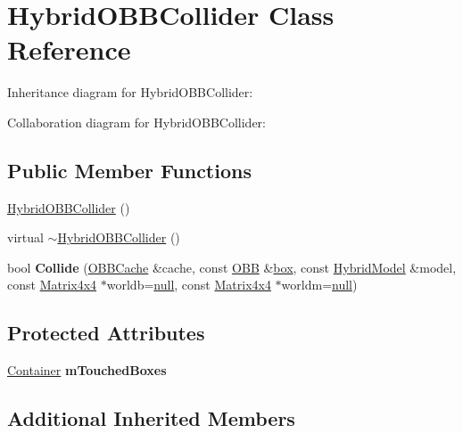 \hypertarget{class_hybrid_o_b_b_collider}{\section{Hybrid\+O\+B\+B\+Collider Class Reference}
\label{class_hybrid_o_b_b_collider}
}


Inheritance diagram for Hybrid\+O\+B\+B\+Collider\+:


Collaboration diagram for Hybrid\+O\+B\+B\+Collider\+:
\subsection*{Public Member Functions}
\begin{DoxyCompactItemize}
\item 
\hyperlink{class_hybrid_o_b_b_collider_a2b99e0c6c8d022f3b6479455c8856976}{Hybrid\+O\+B\+B\+Collider} ()
\item 
virtual \hyperlink{class_hybrid_o_b_b_collider_a5e586273fcac97be30a049b45b584b53}{$\sim$\+Hybrid\+O\+B\+B\+Collider} ()
\item 
\hypertarget{class_hybrid_o_b_b_collider_a4f5c790cc308ace8db5c8d27f5c5805a}{bool {\bfseries Collide} (\hyperlink{struct_o_b_b_cache}{O\+B\+B\+Cache} \&cache, const \hyperlink{class_o_b_b}{O\+B\+B} \&\hyperlink{structbox}{box}, const \hyperlink{class_hybrid_model}{Hybrid\+Model} \&model, const \hyperlink{class_matrix4x4}{Matrix4x4} $\ast$worldb=\hyperlink{_ice_types_8h_ac97b8ee753e4405397a42ad5799b0f9e}{null}, const \hyperlink{class_matrix4x4}{Matrix4x4} $\ast$worldm=\hyperlink{_ice_types_8h_ac97b8ee753e4405397a42ad5799b0f9e}{null})}\label{class_hybrid_o_b_b_collider_a4f5c790cc308ace8db5c8d27f5c5805a}

\end{DoxyCompactItemize}
\subsection*{Protected Attributes}
\begin{DoxyCompactItemize}
\item 
\hypertarget{class_hybrid_o_b_b_collider_a1a98a4480ed5b011d490d26ebac8c8e9}{\hyperlink{class_container}{Container} {\bfseries m\+Touched\+Boxes}}\label{class_hybrid_o_b_b_collider_a1a98a4480ed5b011d490d26ebac8c8e9}

\end{DoxyCompactItemize}
\subsection*{Additional Inherited Members}


